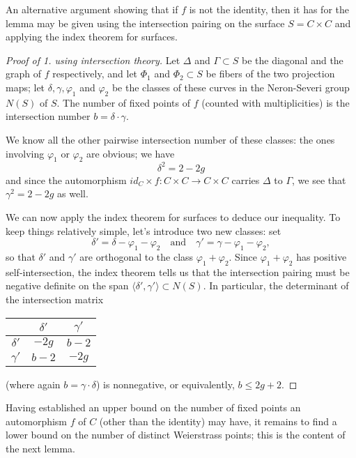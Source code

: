 An alternative argument showing that if $f$ is not the identity, then it has  for the lemma may be given using the intersection pairing on the surface $S = C \times C$ and applying the index theorem for surfaces.

\begin{proof}[Proof of 1. using intersection theory]
Let $\Delta$ and $\Gamma \subset S$ be the diagonal and the graph of $f$ respectively, and let $\Phi_1$ and $\Phi_2 \subset S$ be fibers of the two projection maps; let $\delta, \gamma, \varphi_1$ and $\varphi_2$ be the classes of these curves in the Neron-Severi group $N(S)$  of $S$. The number of fixed points of $f$ (counted with multiplicities) is the intersection number  $b = \delta \cdot \gamma$.

We know all the other pairwise intersection number of these classes: the ones involving $\varphi_1$ or $\varphi_2$ are obvious; we have
$$
\delta^2 = 2 - 2g
$$
and since the automorphism $id_C \times f : C\times C \to C \times C$ carries $\Delta$ to $\Gamma$, we see that $\gamma^2 = 2-2g$ as well.

We can now apply the index theorem for surfaces to deduce our inequality. To keep things relatively simple, let's introduce two new classes: set
$$
\delta' = \delta - \varphi_1 - \varphi_2 \quad \text{and} \quad \gamma' = \gamma - \varphi_1 - \varphi_2,
$$
so that $\delta'$ and $\gamma'$ are orthogonal to the class $\varphi_1 + \varphi_2$. Since $\varphi_1 + \varphi_2$ has positive self-intersection, the index theorem tells us that the intersection pairing must be negative definite on the span $\langle \delta',\gamma' \rangle \subset N(S)$. In particular, the determinant of the intersection matrix
\begin{center}
\begin{tabular}{c|c|c}
& $\delta'$ &  $\gamma'$  \\
\hline
$\delta'$ & $-2g$ & $b-2$ \\
\hline
$\gamma'$ & $b-2$ & $-2g$ 
\end{tabular}
\end{center}
(where again $b = \gamma \cdot \delta$) is nonnegative, or equivalently, $b\leq 2g+2$.
\end{proof}

Having established an upper  bound on the number of fixed points an automorphism $f$ of $C$ (other than the identity) may have, it remains to find a lower bound on the number of distinct Weierstrass points; this is the content of the next lemma.


